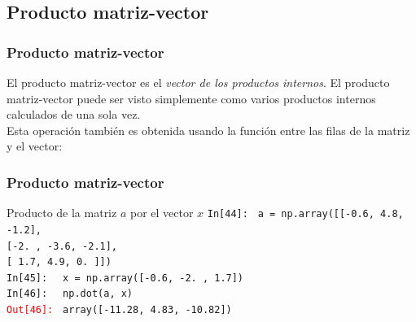 \subsection{Producto matriz-vector}
\begin{frame}[fragile]
\frametitle{Producto matriz-vector}
El producto matriz-vector es el \emph{vector de los productos internos}. El producto matriz-vector puede ser visto simplemente como varios productos internos calculados de una sola vez.
\\
\bigskip
Esta operación también es obtenida usando la función  entre las filas de la matriz y el vector:
\end{frame}
\begin{frame}[fragile]
\frametitle{Producto matriz-vector}
\fontsize{12}{12}\selectfont
\begin{exampleblock}{Producto de la matriz $a$ por el vector $x$}
\textcolor{ao}{\texttt{In[44]: }} \texttt{a = np.array([[-0.6,  4.8, -1.2],} \\
\hspace{4cm} \texttt{[-2. , -3.6, -2.1],} \\
\hspace{4cm} \texttt{[ 1.7,  4.9,  0. ]])} \\
\medskip
\pause
\textcolor{ao}{\texttt{In[45]: }} \texttt{ x = np.array([-0.6, -2. ,  1.7])} \\
\medskip
\pause
\textcolor{ao}{\texttt{In[46]: }} \texttt{ np.dot(a, x)} \\
\medskip
\pause
\textcolor{red}{\texttt{Out[46]: }} \texttt{array([-11.28,  4.83, -10.82])}
\end{exampleblock}
\end{frame}
